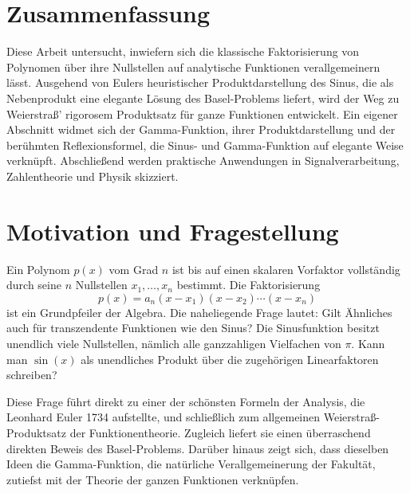 %
%
%
%
\section{Zusammenfassung}

Diese Arbeit untersucht, inwiefern sich die klassische Faktorisierung von Polynomen
%
über ihre Nullstellen auf analytische Funktionen verallgemeinern lässt.
Ausgehend von Eulers heuristischer Produktdarstellung des Sinus,
%
die als Nebenprodukt eine elegante Lösung des Basel-Problems liefert,
%
wird der Weg zu Weierstraß' rigorosem Produktsatz für ganze Funktionen entwickelt.
Ein eigener Abschnitt widmet sich der Gamma-Funktion, ihrer Produktdarstellung
und der berühmten Reflexionsformel, die Sinus- und Gamma-Funktion auf elegante Weise verknüpft.
Abschließend werden praktische Anwendungen in Signalverarbeitung, Zahlentheorie
%
%
und Physik skizziert.
%

\section{Motivation und Fragestellung}

Ein Polynom $p(x)$ vom Grad $n$ ist bis auf einen skalaren Vorfaktor vollständig
durch seine $n$ Nullstellen $x_1, \ldots, x_n$ bestimmt.
%
Die Faktorisierung
\begin{equation}
p(x) = a_n (x - x_1)(x - x_2) \cdots (x - x_n)
\end{equation}
ist ein Grundpfeiler der Algebra.
Die naheliegende Frage lautet: Gilt Ähnliches auch für transzendente Funktionen
wie den Sinus?
Die Sinusfunktion besitzt unendlich viele Nullstellen, nämlich alle ganzzahligen
Vielfachen von $\pi$.
Kann man $\sin(x)$ als unendliches Produkt über die zugehörigen Linearfaktoren schreiben?

Diese Frage führt direkt zu einer der schönsten Formeln der Analysis,
die Leonhard Euler 1734 aufstellte, und schließlich zum allgemeinen
%
Weierstraß-Produktsatz der Funktionentheorie.
Zugleich liefert sie einen überraschend direkten Beweis des Basel-Problems.
Darüber hinaus zeigt sich, dass dieselben Ideen die Gamma-Funktion,
%
die natürliche Verallgemeinerung der Fakultät, zutiefst mit der Theorie
%
der ganzen Funktionen verknüpfen.

